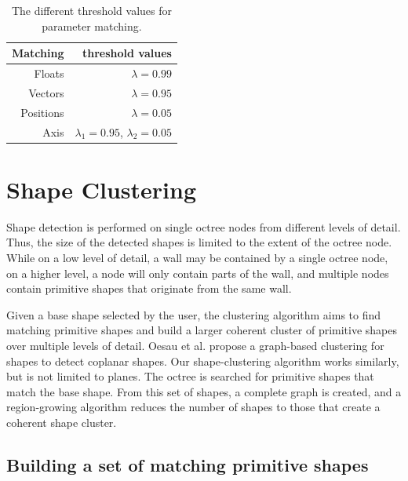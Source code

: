 \begin{table}
\centering
\begin{tabular}{ r | r }
    Matching  & threshold values \\
  \hline
  Floats    & $\lambda = 0.99$ \\
  Vectors     & $\lambda = 0.95$ \\
  Positions    & $\lambda = 0.05$ \\ 
  Axis        & $\lambda_1 = 0.95$, $\lambda_2 = 0.05$\\  

\end{tabular}
\caption[Different threshold values for parameter matching]
{The different threshold values for parameter matching.}
\label{tab:matchingThresholds}
\end{table}


\section{Shape Clustering}
\label{sec:shapeClustering}


Shape detection is performed on single octree nodes from different levels of detail. Thus, the size of the detected shapes is limited to the extent of the octree node. While on a low level of detail, a wall may be contained by a single octree node, on a higher level, a node will only contain parts of the wall, and multiple nodes contain primitive shapes that originate from the same wall. 

\par

Given a base shape selected by the user, the clustering algorithm aims to find matching primitive shapes and build a larger coherent cluster of primitive shapes over multiple levels of detail. Oesau et al. \cite{oesau2016planar} propose a graph-based clustering for shapes to detect coplanar shapes. Our shape-clustering algorithm works similarly, but is not limited to planes. The octree is searched for primitive shapes that match the base shape. From this set of shapes, a complete graph is created, and a region-growing algorithm reduces the number of shapes to those that create a coherent shape cluster. 


\subsection{Building a set of matching primitive shapes}
\label{sec:matchingSetBuilding}

